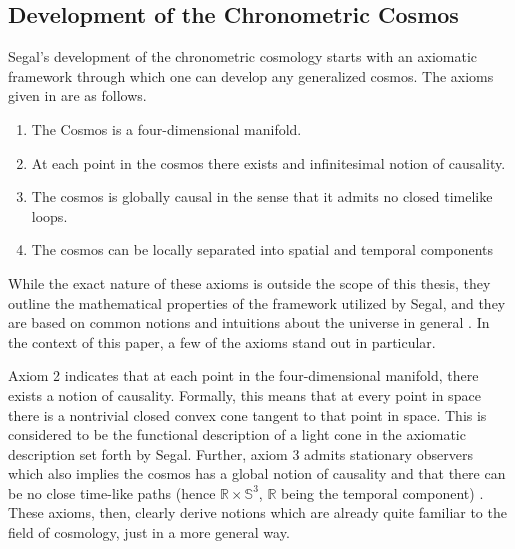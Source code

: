 \documentclass[a4paper]{article}
\begin{document}

    \subsection{Development of the Chronometric Cosmos}
    Segal's development of the chronometric cosmology starts with an axiomatic
    framework through which one can develop any generalized cosmos. The axioms
    given in \cite{segal_b} are as follows.

    \begin{enumerate}
        \item The Cosmos is a four-dimensional manifold\footnotemark.
        \item At each point in the cosmos there exists and infinitesimal 
            notion of causality.
        \item The cosmos is globally causal in the sense that it admits no 
            closed timelike loops.
        \item The cosmos can be locally separated into spatial and temporal components
    \end{enumerate}


    While the exact nature of these axioms is outside the scope of this
    thesis\footnotemark, they outline the mathematical properties of the
    framework utilized by Segal, and they are based on common notions and
    intuitions about the universe in general \cite{segal_b}. In the context of
    this paper, a few of the axioms stand out in particular. 

    Axiom 2 indicates that at each point in the four-dimensional manifold,
    there exists a notion of causality. Formally, this means that at every
    point in space there is a nontrivial closed convex cone tangent to that
    point in space. This is considered to be the functional description of a
    light cone in the axiomatic description set forth by Segal. Further, axiom
    3 admits stationary observers which also implies the cosmos has a global
    notion of causality and that there can be no close time-like paths (hence
    $\mathbb{R} \times \mathbb{S}^3$, $\mathbb{R}$ being the temporal
    component) \cite{segal_b}. These axioms, then, clearly derive notions which
    are already quite familiar to the field of cosmology, just in a more
    general way.
\end{document}
